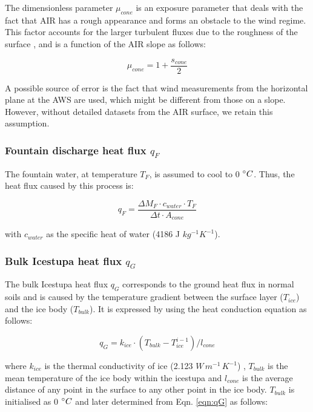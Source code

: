 \documentclass[utf8]{frontiersSCNS}
\begin{document}
The dimensionless parameter $\mu_{cone}$ is an exposure parameter that deals with the fact that AIR has a rough
appearance and forms an obstacle to the wind regime. This factor accounts for the larger turbulent fluxes due to
the roughness of the surface \citep{Oerlemans_2021}, and is a function of the AIR slope as follows:

\begin{equation}
	\mu_{cone} = 1 + \frac{s_{cone}}{2}
\end{equation}

A possible source of error is the fact that wind measurements from the horizontal plane at the AWS are used,
which might be different from those on a slope. However, without detailed datasets from the AIR surface, we
retain this assumption.

\subsubsection{Fountain discharge heat flux \texorpdfstring{$q_{F}$}{Lg} }

The fountain water, at temperature $T_F$, is assumed to cool to 0 $\degree C$. Thus, the heat flux caused by this
process is:

\begin{equation}
	q_{F} = \frac{ \Delta M_F \cdot c_{water} \cdot T_F}{\Delta t \cdot A_{cone}}
	\label{eqn:qF}
\end{equation}

with $c_{water}$ as the specific heat of water (4186 J $kg^{-1} K^{-1}$).

\subsubsection{Bulk Icestupa heat flux \texorpdfstring{$q_{G}$}{Lg}} \label{sec:Bulkflux}

The bulk Icestupa heat flux $q_{G}$ corresponds to the ground heat flux in normal soils and is caused by the
temperature gradient between the surface layer ($T_{ice}$) and the ice body ($T_{bulk}$). It is expressed by
using the heat conduction equation as follows:

\begin{equation} q_{G} = k_{ice} \cdot (T_{bulk}-T_{ice}^{i-1})/l_{cone} \label{eqn:qG}    \end{equation}

where $k_{ice}$ is the thermal conductivity of ice (2.123 $W\, m^{-1}\,K^{-1}$) , $T_{bulk}$ is the mean
temperature of the ice body within the icestupa and $l_{cone}$ is the average distance of any point in the
surface to any other point in the ice body. $T_{bulk}$ is initialised as 0 $\degree C$ and later determined from
Eqn. \ref{eqn:qG} as follows:
\end{document}
